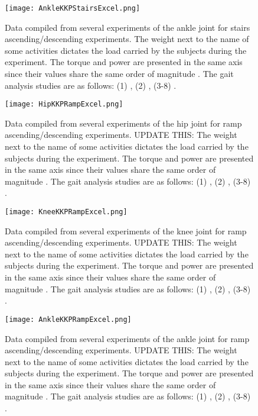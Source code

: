 \begin{figure}[htbp]
    \centering
    \texttt{[image: AnkleKKPStairsExcel.png]}
    \caption{Data compiled from several experiments of the ankle joint for stairs ascending/descending experiments. The weight next to the name of some activities dictates the load carried by the subjects during the experiment. The torque and power are presented in the same axis since their values share the  same order of magnitude \cite{solis2017characterization}. The gait analysis studies are as follows: (1) \cite{bovi2011multiple}, (2) \cite{lee2008biomechanics}, (3-8) \cite{han2011biomechanical}. }
    \label{fig:ankleKKPStairs}
\end{figure}

\begin{figure}[htbp]
    \centering
    \texttt{[image: HipKKPRampExcel.png]}
    \caption{Data compiled from several experiments of the hip joint for ramp ascending/descending experiments. UPDATE THIS: The weight next to the name of some activities dictates the load carried by the subjects during the experiment. The torque and power are presented in the same axis since their values share the  same order of magnitude \cite{solis2017characterization}. The gait analysis studies are as follows: (1) \cite{bovi2011multiple}, (2) \cite{lee2008biomechanics}, (3-8) \cite{han2011biomechanical}. }
    \label{fig:hipKKPRamp}
\end{figure}

\begin{figure}[htbp]
    \centering
    \texttt{[image: KneeKKPRampExcel.png]}
    \caption{Data compiled from several experiments of the knee joint for ramp ascending/descending experiments. UPDATE THIS: The weight next to the name of some activities dictates the load carried by the subjects during the experiment. The torque and power are presented in the same axis since their values share the  same order of magnitude \cite{solis2017characterization}. The gait analysis studies are as follows: (1) \cite{bovi2011multiple}, (2) \cite{lee2008biomechanics}, (3-8) \cite{han2011biomechanical}. }
    \label{fig:kneeKKPRamp}
\end{figure}

\begin{figure}[htbp]
    \centering
    \texttt{[image: AnkleKKPRampExcel.png]}
    \caption{Data compiled from several experiments of the ankle joint for ramp ascending/descending experiments. UPDATE THIS: The weight next to the name of some activities dictates the load carried by the subjects during the experiment. The torque and power are presented in the same axis since their values share the  same order of magnitude \cite{solis2017characterization}. The gait analysis studies are as follows: (1) \cite{bovi2011multiple}, (2) \cite{lee2008biomechanics}, (3-8) \cite{han2011biomechanical}. }
    \label{fig:ankleKKPRamp}
\end{figure}

